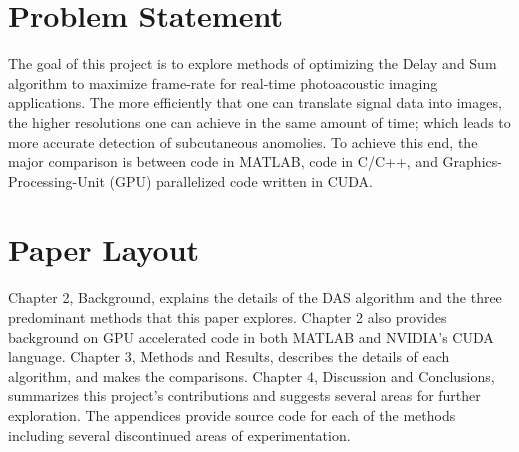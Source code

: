 \section{Problem Statement}
\label{chapter1:problem_statement}

The goal of this project is to explore methods of optimizing the Delay and Sum algorithm to maximize frame-rate for real-time photoacoustic imaging applications. The more efficiently that one can translate signal data into images, the higher resolutions one can achieve in the same amount of time; which leads to more accurate detection of subcutaneous anomolies. To achieve this end, the major comparison is between code in MATLAB, code in C/C++, and Graphics-Processing-Unit (GPU) parallelized code written in CUDA.

\section{Paper Layout}
\label{chapter1:layout}

Chapter 2, Background, explains the details of the DAS algorithm and the three predominant methods that this paper explores. Chapter 2 also provides background on GPU accelerated code in both MATLAB and NVIDIA's CUDA language. Chapter 3, Methods and Results, describes the details of each algorithm, and makes the comparisons. Chapter 4, Discussion and Conclusions, summarizes this project's contributions and suggests several areas for further exploration. The appendices provide source code for each of the methods including several discontinued areas of experimentation.

